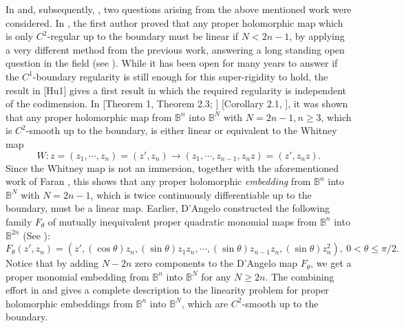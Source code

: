 \documentclass[12pt]{article}
\numberwithin{equation}{section}
\def\ra{\rightarrow}
\def\BB{{\mathbb B}}
\def\ra{\rightarrow}
\begin{document}
In \cite{Hu1} and, subsequently, \cite{HJ},  two  questions arising from the
above mentioned work were considered. In \cite{Hu1}, the first author
proved that any proper holomorphic map which is only $C^2$-regular
up to the boundary must be linear if $N<2n-1$, by applying a very
different method from the previous work, answering a long standing
open question in the field (see \cite{CS1} \cite{Fo2}). While it has been open
for many years to answer if the $C^1$-boundary regularity is still
enough for this super-rigidity to hold, the result in [Hu1] gives a
first result in which the required regularity is independent of the
codimension. In [Theorem 1, Theorem 2.3; \cite{HJ}] [Corollary 2.1, \cite{Hu3}],
it was shown that any proper holomorphic map from ${\BB}^n$ into
${\BB}^N$ with $N=2n-1, n\ge 3$, which is $C^2$-smooth up to the
boundary, is either linear or equivalent to the Whitney map
\begin{equation}\label{000}
 W:
z=(z_1,\cdots,z_n)=(z',z_n)\ra (z_1,\cdots,z_{n-1},
z_nz)=(z',z_nz).
\end{equation}
 Since the Whitney map is not an
immersion, together with the aforementioned work of Faran \cite{Fa1},
this shows that any proper holomorphic {\it embedding} from
${\BB}^n$ into ${\BB}^N$ with $N=2n-1$, which is twice continuously
differentiable up to the boundary, must be a linear map. Earlier,
D'Angelo constructed the following family $F_\theta$ of mutually
inequivalent proper quadratic   monomial maps from ${\BB}^n$ into
${\BB}^{2n}$ (See \cite{DA}):
\begin{equation}
F_{\theta}(z',z_n)=(z',(\cos\theta)z_n,(\sin\theta)z_1z_n, \cdots,
(\sin\theta)z_{n-1}z_n, (\sin\theta)z_n^2),\ 0< \theta\leq \pi/2.
\label{eqn:ftheta}
\end{equation}
Notice that by  adding $N-2n$ zero components to  the D'Angelo map
$F_\theta$,  we get  a proper monomial embedding from ${\BB}^n$ into
${\BB}^{N}$ for any $N\ge 2n$.  The combining effort in \cite{Fa2} and
\cite{HJ} gives a complete description to the linearity problem for
proper holomorphic embeddings from ${\BB}^n$ into ${\BB}^N$, which
are $C^2$-smooth up to the boundary.
\end{document}
